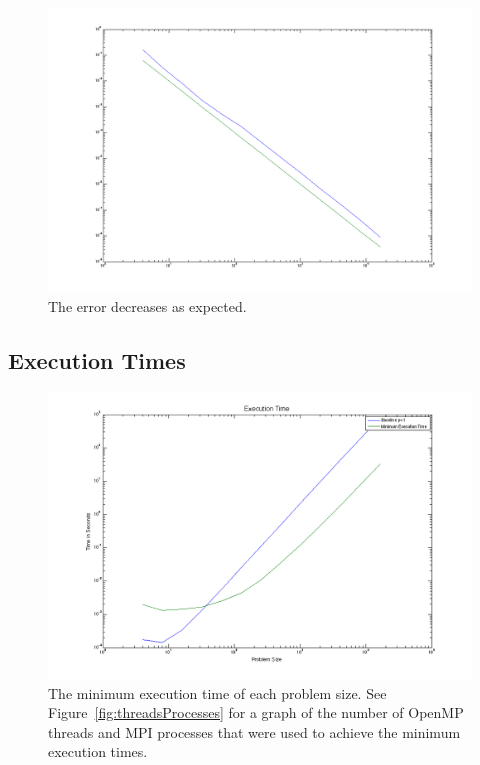 \documentclass{article}
\begin{document}
	\begin{figure}[htbp]
	\begin{center}
	\includegraphics[width=15cm,keepaspectratio=true]{figs/errorGraph}
	\caption{The error decreases as expected.}
	\label{fig:errorGraph}
	\end{center}
	\end{figure}

\subsection{Execution Times}

	\begin{figure}[htbp]
	\begin{center}
	\includegraphics[width=15cm,keepaspectratio=true]{figs/executionTime}
	\caption{The minimum execution time of each problem size. See Figure~\ref{fig:threadsProcesses} for a graph of the number of OpenMP threads and MPI processes that were used to achieve the minimum execution times.}
	\label{fig:executionTime}
	\end{center}
	\end{figure}
\end{document}
